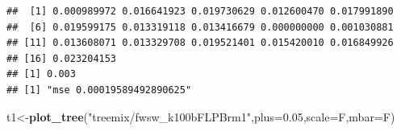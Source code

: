 \documentclass[]{article}
\newenvironment{Shaded}{\begin{snugshade}}{\end{snugshade}}
\newcommand{\KeywordTok}[1]{\textcolor[rgb]{0.13,0.29,0.53}{\textbf{#1}}}
\newcommand{\DataTypeTok}[1]{\textcolor[rgb]{0.13,0.29,0.53}{#1}}
\newcommand{\FloatTok}[1]{\textcolor[rgb]{0.00,0.00,0.81}{#1}}
\newcommand{\StringTok}[1]{\textcolor[rgb]{0.31,0.60,0.02}{#1}}
\newcommand{\NormalTok}[1]{#1}
\begin{document}
\begin{verbatim}
##  [1] 0.000989972 0.016641923 0.019730629 0.012600470 0.017991890
##  [6] 0.019599175 0.013319118 0.013416679 0.000000000 0.001030881
## [11] 0.013608071 0.013329708 0.019521401 0.015420010 0.016849926
## [16] 0.023204153
## [1] 0.003
## [1] "mse 0.00019589492890625"
\end{verbatim}

\begin{Shaded}
\begin{Highlighting}[]
\NormalTok{t1<-}\KeywordTok{plot_tree}\NormalTok{(}\StringTok{"treemix/fwsw_k100bFLPBrm1"}\NormalTok{,}\DataTypeTok{plus=}\FloatTok{0.05}\NormalTok{,}\DataTypeTok{scale=}\NormalTok{F,}\DataTypeTok{mbar=}\NormalTok{F)}
\end{Highlighting}
\end{Shaded}
\end{document}
